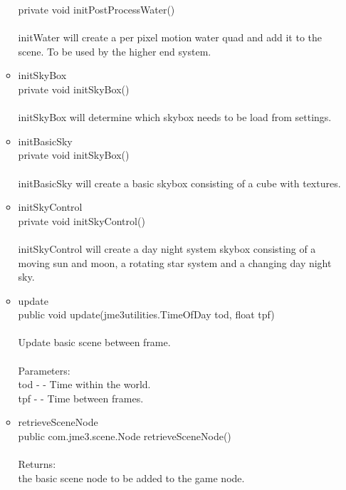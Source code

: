 \documentclass[letterpaper]{article}
\begin{document}
\begin{itemize}
\begin{itemize}
											private void initPostProcessWater() \\ \\
											initWater will create a per pixel motion water quad and add it to the scene. To be used by the higher end system. \\
									\item	initSkyBox \\
											private void initSkyBox() \\ \\ 
											initSkyBox will determine which skybox needs to be load from settings. \\
									\item	initBasicSky \\
											private void initSkyBox() \\ \\ 
											initBasicSky will create a basic skybox consisting of a cube with textures. \\
									\item	initSkyControl \\
											private void initSkyControl() \\ \\ 
											initSkyControl will create a day night system skybox consisting of a moving sun and moon, a rotating star system and a changing day night sky. \\
									\item	update \\
											public void update(jme3utilities.TimeOfDay tod,
		          float tpf) \\ \\
											Update basic scene between frame. \\ \\
											Parameters: \\
											tod - - Time within the world. \\
											tpf - - Time between frames. \\
									\item	retrieveSceneNode \\
											public com.jme3.scene.Node retrieveSceneNode() \\ \\
											Returns: \\
											the basic scene node to be added to the game node.
								\end{itemize}
					\end{itemize}
				
\end{document}
